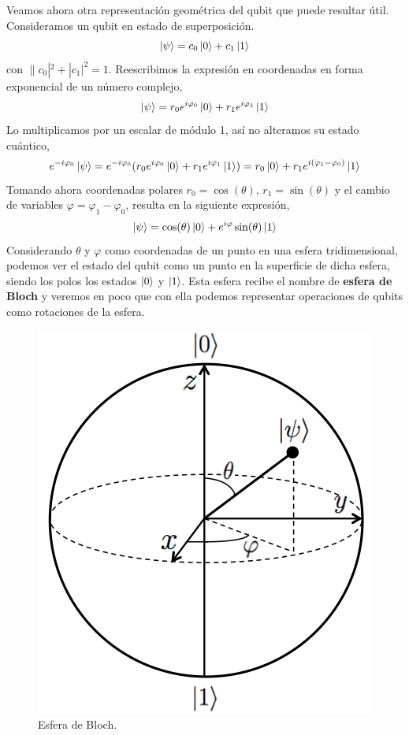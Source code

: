 \documentclass[a4paper]{article}
\numberwithin{equation}{section}
\begin{document}
\linebreak
Veamos ahora otra representación geométrica del qubit que puede resultar útil. Consideramos un qubit en estado de superposición.
\begin{equation}
\ket{\psi} = c_0\ket{0} + c_1\ket{1} 
\end{equation}
con $\|c_0|^2 + |c_1|^2 = 1$. Reescribimos la expresión en coordenadas en forma exponencial de un número complejo,
\begin{equation}
\ket{\psi} = r_0 e^{i\varphi_0}\ket{0} + r_1 e^{i\varphi_1}\ket{1}
\end{equation}
Lo multiplicamos por un escalar de módulo 1, así no alteramos su estado cuántico,
\begin{equation}
e^{-i\varphi_0}\ket{\psi} = e^{-i\varphi_0}(r_0 e^{i\varphi_0}\ket{0} + r_1 e^{i\varphi_1}\ket{1}) = 
r_0\ket{0} + r_1 e^{i(\varphi_1 - \varphi_0)}\ket{1}
\end{equation}
Tomando ahora coordenadas polares $r_0 = \cos(\theta)$, $r_1 = \sin(\theta)$ y el cambio de variables $\varphi = \varphi_1 - \varphi_0$, resulta en la siguiente expresión,
\begin{equation}
\ket{\psi} = \cos(\theta)\ket{0} + e^{i\varphi}\sin(\theta)\ket{1}
\end{equation}
Considerando $\theta$ y $\varphi$ como coordenadas de un punto en una esfera tridimensional, podemos ver el estado del qubit como un punto en la superficie de dicha esfera, siendo los polos los estados $\ket{0}$ y $\ket{1}$. Esta esfera recibe el nombre de \textbf{esfera de Bloch} y veremos en poco que con ella podemos representar operaciones de qubits como rotaciones de la esfera.

\begin{figure}[h]
	\centering
	\includegraphics[scale=.3]{esfera_bloch}
	\caption{Esfera de Bloch.}
\end{figure}
\end{document}
